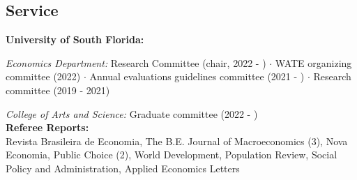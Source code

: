 \documentclass[mm, 10pt]{simple_style}
\begin{document}
\begin{resume}


\section{Service}

\textbf{University of South Florida:} 

\indent \textit{Economics Department:}
Research Committee (chair, 2022 - )
$\cdot$ WATE organizing committee (2022) 
$\cdot$ Annual evaluations guidelines committee (2021 - )
$\cdot$ Research committee (2019 - 2021) 

\indent \textit{College of Arts and Science:}
Graduate committee (2022 - )  \\

\textbf{Referee Reports:} \\
Revista Brasileira de Economia, The B.E. Journal of Macroeconomics (3), Nova Economia, Public Choice (2), World Development, Population Review, Social Policy and Administration, Applied Economics Letters


\end{resume}
\end{document}
